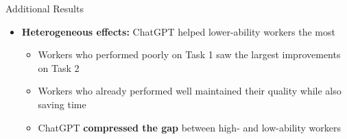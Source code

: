 \documentclass[hyperref={pdfpagelabels=false}]{beamer}
\begin{document}
\begin{frame}{Additional Results}
	\begin{itemize}
		\item \textbf{Heterogeneous effects:} ChatGPT helped lower-ability workers the most
		\vspace{0.2cm}
		\begin{itemize}
			\item Workers who performed poorly on Task 1 saw the largest improvements on Task 2
			\vspace{0.2cm}
			\item Workers who already performed well maintained their quality while also saving time
			\vspace{0.2cm}
			\item ChatGPT \textbf{compressed the gap} between high- and low-ability workers
		\end{itemize}
	\end{itemize}
\end{frame}
\end{document}

